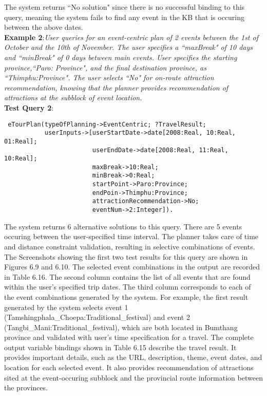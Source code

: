 \hspace{0.3in} The system returns ``No solution" since there is no successful binding to this query, meaning the system fails to find any event in the KB that is occuring between the above dates.\\  

\hspace{0.3in}\textbf{Example 2}:\emph{User queries for an event-centric plan of 2 events between the 1st of October and the 10th of November. The user specifies a ``maxBreak" of 10 days and ``minBreak" of 0 days between main events.
User specifies the starting province,``Paro: Province", and the final
destination province, as ``Thimphu:Province". The user selects ``No" for
on-route attraction recommendation, knowing that the planner
provides recommendation of attractions at the subblock of event
location.}\\

\hspace{0.3in}\textbf{Test Query 2}:
\begin{small}
\singlespacing
\begin{verbatim}
 eTourPlan(typeOfPlanning->EventCentric; ?TravelResult;
           userInputs->[userStartDate->date[2008:Real, 10:Real, 01:Real];  
                        userEndDate->date[2008:Real, 11:Real, 10:Real]; 
                        maxBreak->10:Real;  
                        minBreak->0:Real; 
                        startPoint->Paro:Province;  
                        endPoin->Thimphu:Province;
                        attractionRecommendation->No; 
                        eventNum->2:Integer]).
\end{verbatim} 
\end{small}

\hspace{0.3in}The system returns 6 alternative solutions to this query. There are 5 events occuring between the user-specified time interval. The planner takes care of time and distance constraint validation, resulting in selective combinations of events. The Screenshots showing the first two test results for this query are shown in Figures 6.9 and 6.10. The selected event combinations in the output are recorded in Table 6.16. The second column contains the list of all events that are found within the user's specified trip dates. The third column corresponds to each of the event combinations generated by the system. For example, the first result generated by the system selects event 1 (Tamshingphala\_Choepa:Traditional\_festival) and event 2 (Tangbi\_Mani:Traditional\_festival), which are both located in Bumthang province and validated with user's time specification for a travel. The complete output variable bindings shown in Table 6.15 describe the travel result. It provides important details, such as the URL, description, theme, event dates, and location for each selected event. It also provides recommendation of attractions sited at the event-occuring subblock and the provincial route information between the provinces. 

